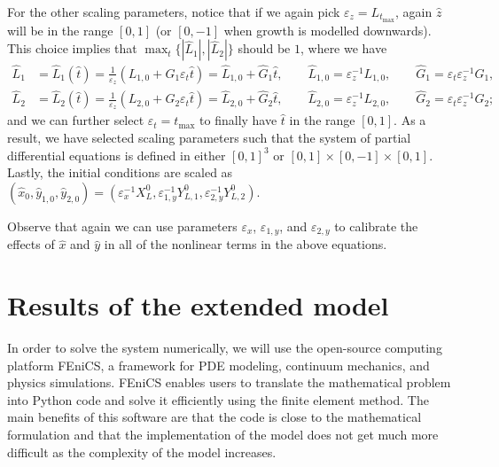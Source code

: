 \documentclass[11pt]{article}
\begin{document}
For the other scaling parameters, notice that if we again pick \( \varepsilon_z = L_{t_{\max}}\), again \(\hat z \) will be in the range \( [0,1]\) (or \([0,-1]\) when growth is modelled downwards). 
This choice implies that \( \max_t\{|\hat{L}_1|,|\hat{L}_2|\}\) should be \(1\), where we have
\begin{align}
    \hat{L}_1 &= \hat{L}_1(\hat t) = \frac{1}{\varepsilon_z} ( L_{1,0} + G_1 \varepsilon_t \hat t )
    = \hat{L}_{1,0} + \hat{G}_1 \hat t,
    \qquad 
    \hat{L}_{1,0} = \varepsilon^{-1}_z L_{1,0},
    \qquad
    \hat{G}_1 = \varepsilon_t \varepsilon_z^{-1} G_1,
    \\
    \hat{L}_2 &= \hat{L}_2(\hat t) = \frac{1}{\varepsilon_z} ( L_{2,0} + G_2 \varepsilon_t \hat t )
    = \hat{L}_{2,0} + \hat{G}_2 \hat t,
    \qquad 
    \hat{L}_{2,0} = \varepsilon^{-1}_z L_{2,0},
    \qquad
    \hat{G}_2 = \varepsilon_t \varepsilon_z^{-1} G_2;
\end{align}
and we can further select \( \varepsilon_t = t_{\max}\) to finally have \( \hat t\) in the range \( [0,1]\). As a result, we have selected scaling parameters such that the system of partial differential equations is defined in either \( [0,1]^3\) or \([0,1]\times [0,-1] \times [0,1]\).
%
Lastly, the initial conditions are scaled as \( (\hat{x}_0,\hat{y}_{1,0},\hat{y}_{2,0} ) = (\varepsilon_x^{-1} X^0_L, \varepsilon_{1,y}^{-1} Y^0_{L,1}, \varepsilon_{2,y}^{-1} Y^0_{L,2}) \). 


Observe that again we can use parameters \(\varepsilon_x\), \(\varepsilon_{1,y}\), and \(\varepsilon_{2,y}\) to calibrate the effects of \( \hat{x}\) and \(\hat{y}\) in all of the nonlinear terms in the above equations.

\newpage

\section{Results of the extended model}
In order to solve the system numerically, we will use the open-source computing platform
FEniCS, a framework for PDE modeling, continuum mechanics, and physics simulations.
FEniCS enables users to translate the mathematical problem into Python code and solve it
efficiently using the finite element method. The main benefits of this software are that the code
is close to the mathematical formulation and that the implementation of the model does not
get much more difficult as the complexity of the model increases.
\end{document}
